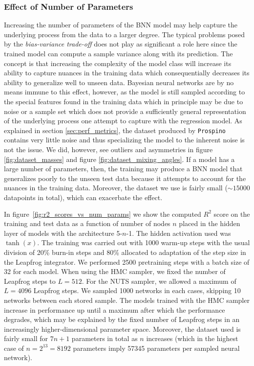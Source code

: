 \subsubsection{Effect of Number of Parameters}
Increasing the number of parameters of the BNN model may help capture the underlying process from the data to a larger degree. The typical problems posed by the \textit{bias-variance trade-off} \cite{ml_for_physicists} does not play as significant a role here since the trained model can compute a sample variance along with its prediction. The concept is that increasing the complexity of the model class will increase its ability to capture nuances in the training data which consequentially decreases its ability to generalize well to unseen data. Bayesian neural networks are by no means immune to this effect, however, as the model is still sampled according to the special features found in the training data which in principle may be due to noise or a sample set which does not provide a sufficiently general representation of the underlying process one attempt to capture with the regression model. As explained in section \ref{sec:perf_metrics}, the dataset produced by {\tt Prospino} contains very little noise and thus specializing the model to the inherent noise is not the issue. We did, however, see outliers and asymmetries in figure \ref{fig:dataset_masses} and figure \ref{fig:dataset_mixing_angles}. If a model has a large number of parameters, then, the training may produce a BNN model that generalizes poorly to the unseen test data because it attempts to account for the nuances in the training data. Moreover, the dataset we use is fairly small ($\sim 15000$ datapoints in total), which can exacerbate the effect.

In figure~\ref{fig:r2_scores_vs_num_params} we show the computed $R^2$ score on the training and test data as a function of number of nodes $n$ placed in the hidden layer of models with the architecture 5-$n$-1. The hidden activation used was $\tanh(x)$. The training was carried out with 1000 warm-up steps with the usual division of 20\% burn-in steps and 80\% allocated to adaptation of the step size in the Leapfrog integrator. We performed 2500 pretraining steps with a batch size of 32 for each model. When using the HMC sampler, we fixed the number of Leapfrog steps to $L = 512$. For the NUTS sampler, we allowed a maximum of $L = 4096$ Leapfrog steps. We sampled 1000 networks in each cases, skipping 10 networks between each stored sample. The models trained with the HMC sampler increase in performance up until a maximum after which the performance degrades, which may be explained by the fixed number of Leapfrog steps in an increasingly higher-dimensional parameter space. Moreover, the dataset used is fairly small for $7n + 1$ parameters in total as $n$ increases (which in the highest case of $n = 2^{13} = 8192$ parameters imply 57345 parameters per sampled neural network). 

